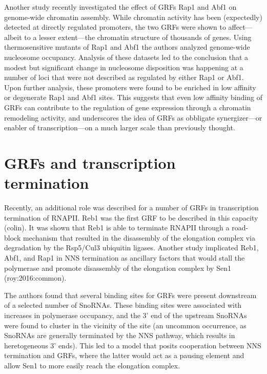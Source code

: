 Another study recently investigated the effect of GRFs Rap1 and Abf1 on genome-wide chromatin assembly. While chromatin activity has been (expectedly) detected at directly regulated promoters, the two GRFs were shown to affect—albeit to a lesser extent—the chromatin structure of thousands of genes. Using thermosensitive mutants of Rap1 and Abf1 the authors analyzed genome-wide nucleosome occupancy. Analysis of these datasets led to the conclusion that a modest but significant change in nucleosome disposition was happening at a number of loci that were not described as regulated by either Rap1 or Abf1. Upon further analysis, these promoters were found to be enriched in low affinity or degenerate Rap1 and Abf1 sites. This suggests that even low affinity binding of GRFs can contribute to the regulation of gene expression through a chromatin remodeling activity, and underscores the idea of GRFs as obbligate synergizer—or enabler of transcription—on a much larger scale than previously thought. 

\section{GRFs and transcription termination}

Recently, an additional role was described for a number of GRFs in transcription termination of RNAPII. Reb1 was the first GRF to be described in this capacity (colin). It was shown that Reb1 is able to terminate RNAPII through a road-block mechanism that resulted in the disassembly of the elongation complex via degradation by the Rsp5/Cul3 ubiquitin ligases. Another study implicated Reb1, Abf1, and Rap1 in NNS termination as ancillary factors that would stall the polymerase and promote disassembly of the elongation complex by Sen1 (roy:2016:common).

The authors found that several binding sites for GRFs were present downstream of a selected number of SnoRNAs. These binding sites were associated with increases in polymerase occupancy, and the 3’ end of the upstream SnoRNAs were found to cluster in the vicinity of the site (an uncommon occurrence, as SnoRNAs are generally terminated by the NNS pathway, which results in heretogeneous 3’ ends). This led to a model that posits cooperation between NNS termination and GRFs, where the latter would act as a pausing element and allow Sen1 to more easily reach the elongation complex.

 

